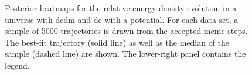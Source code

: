 \begin{figure}[htbp]
    \tagstructend
    \caption[Posterior heatmaps for relative energy densities.]{Posterior heatmaps for the relative energy-density evolution in a universe with \gls{dc}\gls{dm} and \gls{de} with a  potential. For each data set, a sample of 5000 trajectories is drawn from the accepted \gls{mcmc} steps. The best-fit trajectory (solid line) as well as the median of the sample (dashed line) are shown. The lower-right panel contains the legend.}
    \label{fig:HyperbolicOmegaHeatmap}
\end{figure}
